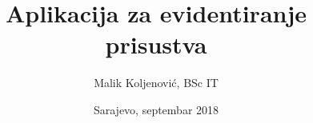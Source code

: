 \documentclass[a4paper,11pt,titlepage]{report}
\title{Aplikacija za evidentiranje prisustva}
\author{Malik Koljenović, BSc IT}
\date{Sarajevo, septembar 2018}
\begin{document}
	
	
	\tableofcontents
	\listoffigures
	\listoftables
    \glsaddall
	\printglossaries
	
	
	
	
	
	
	
	\begin{appendices}
		
		
		
		
	\end{appendices}
	
	
	
\end{document}
